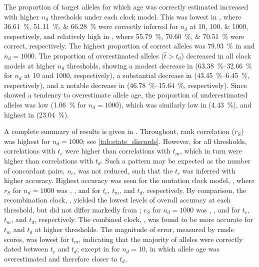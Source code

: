 The proportion of target alleles for which age was correctly estimated increased with higher $n_d$ thresholds under each clock model.
This was lowest in \ClockM, where \SIlist{36.61;51.11;66.28}{\percent} were correctly inferred for $n_d$ at \numlist{10;100;1000}, respectively, and relatively high in \ClockR, where \SIlist{55.79;70.60;70.51}{\percent} were correct, respectively.
The highest proportion of correct alleles was \SI{79.93}{\percent} in \ClockC and ${n_d = \num{1000}}$.
The proportion of overestimated alleles (${\hat{t} > t_d}$) decreased in all clock models at higher $n_d$ thresholds, showing a modest decrease in \ClockM (\SIrange{63.38}{32.66}{\percent} for $n_d$ at \num{10} and \num{1000}, respectively), a substantial decrease in \ClockR (\SIrange{43.45}{6.45}{\percent}, respectively), and a notable decrease in \ClockC (\SIrange{46.78}{15.64}{\percent}, respectively).
Since \ClockM showed a tendency to overestimate allele age, the proportion of underestimated alleles was low (\SI{1.06}{\percent} for ${n_d = \num{1000}}$), which was similarly low in \ClockC (\SI{4.43}{\percent}), and highest in \ClockR (\SI{23.04}{\percent}).

%

%

A complete summary of results is given in .
Throughout, rank correlation ($r_S$) was highest for ${n_d = \num{1000}}$; see \cref{tab:stats_discords}.
However, for all thresholds, correlations with $t_c$ were higher than correlations with $t_m$, which in turn were higher than correlations with $t_d$.
Such a pattern may be expected as the number of concordant pairs, $n_c$, was not reduced, such that the $t_c$ was inferred with higher accuracy.
Highest accuracy was seen for the mutation clock model, \ClockM, where $r_S$ for ${n_d = \num{1000}}$ was , , and  for $t_c$, $t_m$, and $t_d$, respectively.
By comparison, the recombination clock, \ClockR, yielded the lowest levels of overall accuracy at each threshold, but did not differ markedly from \ClockM; \eg $r_S$ for ${n_d = \num{1000}}$ was , , and  for $t_c$, $t_m$, and $t_d$, respectively.
The combined clock, \ClockC, was found to be more accurate for $t_m$ and $t_d$ at higher thresholds.
The magnitude of error, measured by \gls{rmsle} scores, was lowest for $t_m$, indicating that the majority of alleles were correctly dated between $t_c$ and $t_d$; except in \ClockM for ${n_d = \num{10}}$, in which allele age was overestimated and therefore closer to $t_d$.

